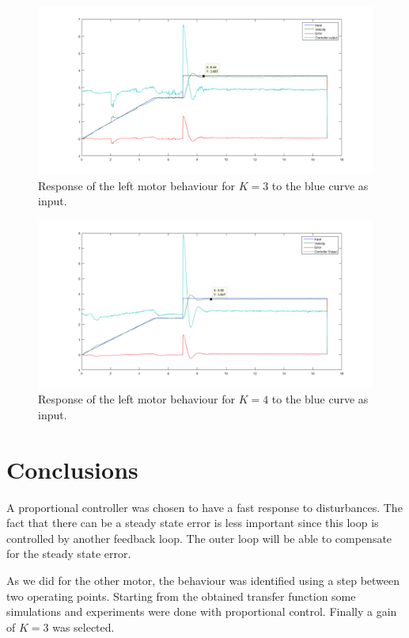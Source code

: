 \begin{figure}[htbp]
\centering
\includegraphics[width = \textwidth]{pics/RM_K3.png}
\caption{Response of the left motor behaviour for $K = 3$ to the blue curve as input.}
\label{fig:RM_K3}
\end{figure}

\begin{figure}[htbp]
\centering
\includegraphics[width = \textwidth]{pics/RM_K4.png}
\caption{Response of the left motor behaviour for $K = 4$ to the blue curve as input.}
\label{fig:RM_K4}
\end{figure}


\section{Conclusions}
A proportional controller was chosen to have a fast response to disturbances. The fact that there can be a steady state error is less important since this loop is controlled by another feedback loop. The outer loop will be able to compensate for the steady state error.

As we did for the other motor, the behaviour was identified using a step between two operating points. Starting from the obtained transfer function some simulations and experiments were done with proportional control. Finally a gain of $K = 3$ was selected. 
